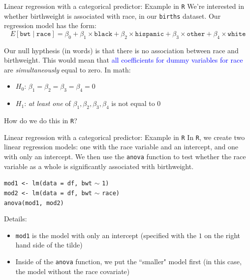 \documentclass[10pt,t]{beamer}
\begin{document}
\begin{frame}{Linear regression with a categorical predictor: Example in \texttt{R}}
We're interested in whether birthweight is associated with race, in our \texttt{births} dataset. Our regression model has the form:
$$
E[\texttt{bwt} \mid \texttt{race}] = \beta_0 + \beta_1 \times \texttt{black} + \beta_2 \times \texttt{hispanic} + \beta_3 \times \texttt{other} + \beta_4 \times \texttt{white}
$$ \pause

Our null hypthesis (in words) is that there is no association between race and birthweight. This would mean that \textcolor{blue}{all coefficients for dummy variables for race} are \textit{simultaneously} equal to zero. \pause In math:

\vspace{0.3cm}

\begin{itemize}
	\item $H_0$: $\beta_1 = \beta_2 = \beta_3 =\beta_4 =  0$
	\item $H_1$: \textit{at least one} of $\beta_1, \beta_2, \beta_3, \beta_4$ is not equal to $0$
\end{itemize} \pause

\vspace{0.3cm}

How do we do this in \texttt{R}?

\end{frame}

\begin{frame}{Linear regression with a categorical predictor: Example in \texttt{R}}
In \texttt{R}, we create two linear regression models: one with the race variable and an intercept, and one with only an intercept. We then use the \texttt{anova} function to test whether the race variable as a whole is significantly associated with birthweight.

\vspace{0.3cm}

\texttt{mod1 <- lm(data = df, bwt} $\sim$ \texttt{1) \\
	mod2 <- lm(data = df, bwt} $\sim$ \texttt{race) \\
	anova(mod1, mod2)} \pause

\vspace{0.3cm}

Details:
\begin{itemize}
	\item \texttt{mod1} is the model with only an intercept (specified with the $1$ on the right hand side of the tilde)
	\item Inside of the \texttt{anova} function, we put the ``smaller" model first (in this case, the model without the race covariate)
\end{itemize}
\end{frame}
\end{document}
